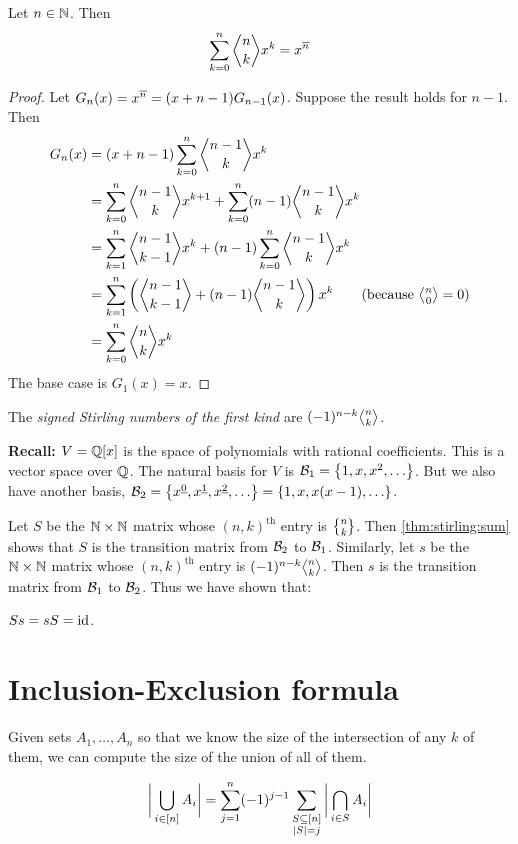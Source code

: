 \begin{proposition*} \label{thm:cycle:sum}
    Let $n \in \mathbb{N}$.
    Then \[
        \sum_{k=0}^{n} \cycle{n}{k} x^k = x^{\wbar{n}}
    \]
\end{proposition*}
\begin{proof}
    Let $G_n(x) = x^{\overline{n}} = (x+n-1) G_{n-1}(x)$.
    Suppose the result holds for $n-1$.
    Then \begin{align*}
        G_n(x) &= (x + n - 1) \sum_{k=0}^{n} \cycle{n-1}{k} x^k \\
            &= \sum_{k=0}^{n} \cycle{n-1}{k} x^{k+1}
                + \sum_{k=0}^{n} (n-1) \cycle{n-1}{k} x^k \\
            &= \sum_{k=1}^{n} \cycle{n-1}{k-1} x^k
                + (n-1) \sum_{k=0}^{n} \cycle{n-1}{k} x^k \\
            &= \sum_{k=1}^{n} \left(\cycle{n-1}{k-1} + (n-1) \cycle{n-1}{k}
                \right) x^k \tag{because $\cycle{n}{0} = 0$} \\
            &= \sum_{k=0}^{n} \cycle{n}{k} x^k
    \end{align*}
    The base case is $G_1(x) = x$. %
\end{proof}

\begin{definition*}
    The \emph{signed Stirling numbers of the first kind} are
    $(-1)^{n-k} \cycle{n}{k}$.
\end{definition*}

\textbf{Recall:} $V = \mathbb{Q}[x]$ is the space of polynomials with rational
coefficients.
This is a vector space over $\mathbb{Q}$.
The natural basis for $V$ is $\mcB_1 = \set{1, x, x^2, \dots}$.
But we also have another basis, $\mcB_2 = \set{x^{\underline{0}},
x^{\underline{1}}, x^{\underline{2}}, \dots} = \set{1, x, x(x-1), \dots}$.

Let $S$ be the $\mathbb{N} \times \mathbb{N}$ matrix whose $(n, k)^{\text{th}}$ entry is
$\stirling{n}{k}$.
Then \cref{thm:stirling:sum} shows that $S$ is the transition matrix from
$\mathcal{B}_2$ to $\mathcal{B}_1$.
Similarly, let $s$ be the $\mathbb{N} \times \mathbb{N}$ matrix whose $(n, k)^{\text{th}}$
entry is $(-1)^{n-k} \cycle{n}{k}$.
Then $s$ is the transition matrix from $\mathcal{B}_1$ to $\mathcal{B}_2$.
Thus we have shown that:
\begin{proposition}
    $Ss = sS = \mathrm{id}$.
\end{proposition}

\section{Inclusion-Exclusion formula} \label{sec:pie}
Given sets $A_1, \dots, A_n$ so that we know the size of the intersection of
any $k$ of them, we can compute the size of the union of all of them.
\begin{theorem*} \label{thm:pie}
    \[
        \bigg\lvert\bigcup_{i\in[n]} A_i\bigg\rvert
            = \sum_{j=1}^{n} (-1)^{j-1} \sum_{\substack{S \subseteq [n] \\
            \abs{S} = j}} \bigg\lvert\bigcap_{i \in S} A_i\bigg\rvert
    \]
\end{theorem*}
